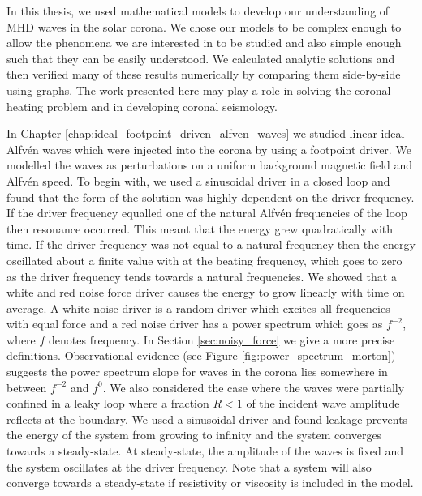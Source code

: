 In this thesis, we used mathematical models to develop our understanding of MHD waves in the solar corona.
We chose our models to be complex enough to allow the phenomena we are interested in to be studied and also simple enough such that they can be easily understood. We calculated analytic solutions and then verified many of these results numerically by comparing them side-by-side using graphs. The work presented here may play a role in solving the coronal heating problem and in developing coronal seismology. 

In Chapter \ref{chap:ideal_footpoint_driven_alfven_waves} we studied linear ideal Alfv\'en waves which were injected into the corona by using a footpoint driver. We modelled the waves as perturbations on a uniform background magnetic field and Alfv\'en speed. To begin with, we used a sinusoidal driver in a closed loop and found that the form of the solution was highly dependent on the driver frequency. If the driver frequency equalled one of the natural Alfv\'en frequencies of the loop then resonance occurred. This meant that the energy grew quadratically with time. If the driver frequency was not equal to a natural frequency then the energy oscillated about a finite value with at the beating frequency, which goes to zero as the driver frequency tends towards a natural frequencies. We showed that a white and red noise force driver causes the energy to grow linearly with time on average. A white noise driver is a random driver which excites all frequencies with equal force and a red noise driver has a power spectrum which goes as $f^{-2}$, where $f$ denotes frequency. In Section \ref{sec:noisy_force} we give a more precise definitions. Observational evidence (see Figure \ref{fig:power_spectrum_morton}) suggests the power spectrum slope for waves in the corona lies somewhere in between $f^{-2}$ and $f^0$. We also considered the case where the waves were partially confined in a leaky loop where a fraction $R<1$ of the incident wave amplitude reflects at the boundary. We used a sinusoidal driver and found leakage prevents the energy of the system from growing to infinity and the system converges towards a steady-state. At steady-state, the amplitude of the waves is fixed and the system oscillates at the driver frequency. Note that a system will also converge towards a steady-state if resistivity or viscosity is included in the model.

